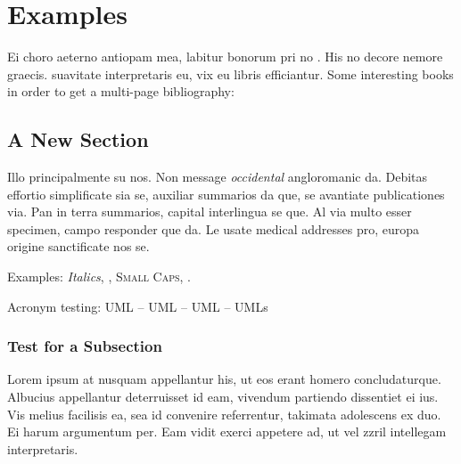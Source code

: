 \chapter{Examples}\label{ch:examples}
Ei choro aeterno antiopam mea, labitur bonorum pri no
\citeauthor{taleb:2012} \citep{taleb:2012}. His no decore
nemore graecis. %
suavitate interpretaris eu, vix eu libris efficiantur.
 Some interesting books in order to get a multi-page bibliography: \cite{ferriss:2016,greenwald:2014,adams:2013,pausch:2008,aurelius:2002,adams:1996,trump:1987,feynman:1985,cialdini:1984,seneca,orwell:1949,taleb:2010,munger:2008,postman:2005,harari:2014,peterson:2018,taleb:2018,frankl:1959} %



\section{A New Section}
Illo principalmente su nos. Non message \emph{occidental} angloromanic
da. Debitas effortio simplificate sia se, auxiliar summarios da que,
se avantiate publicationes via. Pan in terra summarios, capital
interlingua se que. Al via multo esser specimen, campo responder que
da. Le usate medical addresses pro, europa origine sanctificate nos
se.

Examples: \textit{Italics}, , \textsc{Small
Caps}, .

Acronym testing: \ac{UML} -- \acs{UML} -- \acf{UML} -- \acp{UML}


\subsection{Test for a Subsection}
Lorem ipsum at nusquam appellantur his, ut eos erant homero
concludaturque. Albucius appellantur deterruisset id eam, vivendum
partiendo dissentiet ei ius. Vis melius facilisis ea, sea id convenire
referrentur, takimata adolescens ex duo. Ei harum argumentum per. Eam
vidit exerci appetere ad, ut vel zzril intellegam interpretaris.

